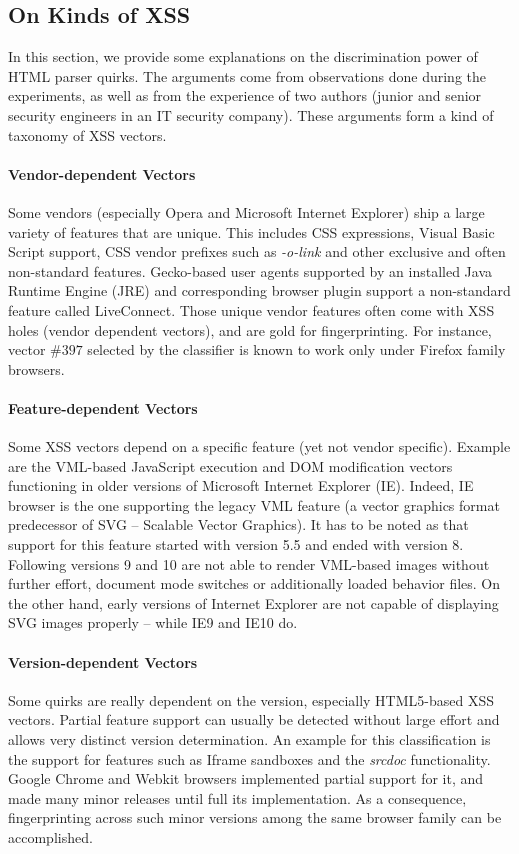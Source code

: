 \documentclass[10pt]{IEEEtran}
\begin{document}
\subsection{On Kinds of XSS}
\label{sec:xss-kind}
In this section, we provide some explanations on the discrimination power of HTML parser quirks.
The arguments come from observations done during the experiments, 
as well as from the experience of two authors (junior and senior security engineers in an IT security company).
These arguments form a kind of taxonomy of XSS vectors.
 
\paragraph{Vendor-dependent Vectors} Some vendors (especially Opera and Microsoft Internet Explorer) ship a 
 large variety of features that are unique. 
 This includes CSS expressions, Visual Basic Script support, CSS vendor prefixes such 
 as \textit{-o-link} and other exclusive and often non-standard features. Gecko-based user 
 agents supported by an installed Java Runtime Engine (JRE) and corresponding browser plugin 
 support a non-standard feature called LiveConnect.
 Those unique vendor features often come with XSS holes (vendor dependent vectors), and are gold for fingerprinting.
 For instance, vector \#$397$ 
 selected by the classifier is known to work only under Firefox family browsers.
 
\paragraph{Feature-dependent Vectors} Some XSS vectors depend on a specific feature (yet not vendor specific). 
 Example are the VML-based JavaScript execution and DOM modification 
 vectors functioning in older versions of Microsoft Internet Explorer (IE). Indeed, IE browser is the 
 one supporting the legacy VML feature (a vector graphics format predecessor of SVG -- Scalable Vector Graphics). 
 It has to be noted as that support for this feature started with version 5.5 and ended 
 with version 8. Following versions 9 and 10 are not able to render VML-based images without 
 further effort, document mode switches or additionally loaded behavior files. On the other hand, 
 early versions of Internet Explorer are not capable of displaying SVG images properly -- 
 while IE9 and IE10 do.
 
\paragraph{Version-dependent Vectors} 
  Some quirks are really dependent on the version, especially HTML5-based XSS vectors.
  Partial feature support can usually be detected without large effort 
  and allows very distinct version determination. An example for this classification is the 
  support for features such as Iframe sandboxes and the \textit{srcdoc} functionality. Google 
  Chrome and Webkit browsers implemented partial support for it, and made many minor releases 
   until full its implementation. As a consequence,
  fingerprinting across such minor  versions among the same browser family can be accomplished.   
 
\end{document}
